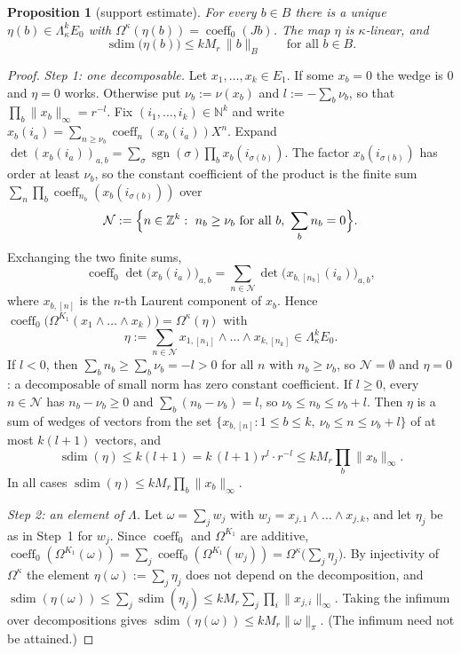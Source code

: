 \documentclass[11pt]{amsart}
\newtheorem{proposition}[theorem]{Proposition}
\theoremstyle{definition}
\theoremstyle{remark}
\numberwithin{equation}{section}
\newcommand{\N}{\mathbb{N}}
\newcommand{\Z}{\mathbb{Z}}
\newcommand{\coeff}{\operatorname{coeff}}
\newcommand{\sgn}{\operatorname{sgn}}
\newcommand{\sdim}{\operatorname{sdim}}
\newcommand{\norm}[1]{\lVert #1\rVert}
\begin{document}
\begin{proposition}[support estimate]\label{prop:supp}
For every $b\in B$ there is a unique $\eta(b)\in\Lambda^k_\kappa E_0$ with $\Omega^\kappa(\eta(b))=\coeff_0(Jb)$. The map $\eta$ is
$\kappa$\nobreakdash-linear, and
\begin{equation}\label{eq:suppest}
\sdim\bigl(\eta(b)\bigr)\le kM_r\,\norm b_B\qquad\text{for all }b\in B .
\end{equation}
\end{proposition}

\begin{proof}
\emph{Step 1: one decomposable.} Let $x_1,\dots,x_k\in E_1$. If some $x_b=0$ the wedge is $0$ and $\eta=0$ works.
Otherwise put $\nu_b:=\nu(x_b)$ and $l:=-\sum_b\nu_b$, so that $\prod_b\norm{x_b}_\infty=r^{-l}$. Fix
$(i_1,\dots,i_k)\in\N^k$ and write $x_b(i_a)=\sum_{n\ge\nu_b}\coeff_n(x_b(i_a))X^n$. Expand
$\det(x_b(i_a))_{a,b}=\sum_\sigma\sgn(\sigma)\prod_bx_b(i_{\sigma(b)})$. The factor $x_b(i_{\sigma(b)})$ has order at
least $\nu_b$, so the constant coefficient of the product is the finite sum
$\sum_n\prod_b\coeff_{n_b}(x_b(i_{\sigma(b)}))$ over
\[
\mathcal N:=\Bigl\{n\in\Z^k:\ n_b\ge\nu_b\text{ for all }b,\ \sum_bn_b=0\Bigr\}.
\]
Exchanging the two finite sums,
\[
\coeff_0\det\bigl(x_b(i_a)\bigr)_{a,b}=\sum_{n\in\mathcal N}\det\bigl(x_{b,[n_b]}(i_a)\bigr)_{a,b},
\]
where $x_{b,[n]}$ is the $n$\nobreakdash-th Laurent component of $x_b$. Hence $\coeff_0\bigl(\Omega^{K_1}(x_1\wedge\dots\wedge x_k)\bigr)=\Omega^\kappa(\eta)$
with
\[
\eta:=\sum_{n\in\mathcal N}x_{1,[n_1]}\wedge\dots\wedge x_{k,[n_k]}\in\Lambda^k_\kappa E_0 .
\]
If $l<0$, then $\sum_bn_b\ge\sum_b\nu_b=-l>0$ for all $n$ with $n_b\ge\nu_b$, so $\mathcal N=\emptyset$ and $\eta=0$: a
decomposable of small norm has zero constant coefficient. If $l\ge0$, every $n\in\mathcal N$ has $n_b-\nu_b\ge0$ and
$\sum_b(n_b-\nu_b)=l$, so $\nu_b\le n_b\le\nu_b+l$. Then $\eta$ is a sum of wedges of vectors from the set
$\{x_{b,[n]}:1\le b\le k,\ \nu_b\le n\le\nu_b+l\}$ of at most $k(l+1)$ vectors, and
\[
\sdim(\eta)\le k(l+1)=k\,(l+1)r^l\cdot r^{-l}\le kM_r\prod_b\norm{x_b}_\infty .
\]
In all cases $\sdim(\eta)\le kM_r\prod_b\norm{x_b}_\infty$.

\emph{Step 2: an element of $\Lambda$.} Let $\omega=\sum_jw_j$ with $w_j=x_{j,1}\wedge\dots\wedge x_{j,k}$, and let
$\eta_j$ be as in Step~1 for $w_j$. Since $\coeff_0$ and $\Omega^{K_1}$ are additive,
$\coeff_0(\Omega^{K_1}(\omega))=\sum_j\coeff_0(\Omega^{K_1}(w_j))=\Omega^\kappa\bigl(\sum_j\eta_j\bigr)$.
By injectivity of $\Omega^\kappa$ the element $\eta(\omega):=\sum_j\eta_j$ does not depend on the decomposition, and
$\sdim(\eta(\omega))\le\sum_j\sdim(\eta_j)\le kM_r\sum_j\prod_i\norm{x_{j,i}}_\infty$. Taking the infimum over
decompositions gives $\sdim(\eta(\omega))\le kM_r\norm\omega_\pi$. (The infimum need not be attained.)


\end{proof}
\end{document}
